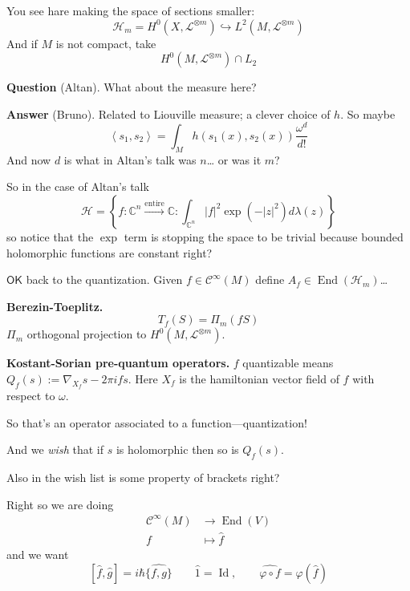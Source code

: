 You see hare making the space of sections
smaller:
$$
\mathcal{H}_m=H^{0}(X,\mathcal{L}^{\otimes
m})\hookrightarrow L^2(M,\mathcal{L}^{\otimes
m})
$$
And if $M$ is not compact, take
$$
H^{0}(M,\mathcal{L}^{\otimes m})\cap L_2
$$

\medskip\noindent
{\bf Question} (Altan).
What about the measure here?

\medskip\noindent
{\bf Answer} (Bruno).
Related to Liouville measure; a clever choice
of $h$. So maybe
$$
\left\langle{} s_1,s_2 \right\rangle{}
=\int_{M}h\left( s_1(x),s_2(x) \right)
\frac{\omega^d}{d!}
$$
And now $d$ is what in Altan's talk was
$n$\ldots{} or was it $m$?

\begin{remark}
\label{remark-suassuna-altan}
So in the case of Altan's talk
$$
\mathcal{H}=\left\{
f:\mathbb{C}^{n}\overset{\operatorname{entire}}{\longrightarrow}
\mathbb{C}:\int_{\mathbb{C}^{n}}|f|^2
\operatorname{exp}(-|z|^2)
d \lambda(z) \right\}
$$
so notice that the $\operatorname{exp}$ term
is stopping the space to be trivial because
bounded holomorphic functions are constant
right?
\end{remark}

$\mathsf{OK}$ back to the quantization. Given
$f \in\mathcal{C}^\infty(M)$ define $A_f
\in\operatorname{End}(\mathcal{H}_m)$\ldots{}

\medskip\noindent
{\bf Berezin-Toeplitz.}
$$
T_f(S)=\Pi_m(fS)
$$
$\Pi_m$ orthogonal projection to
$H^{0}(M,\mathcal{L}^{\otimes m})$.

\medskip\noindent
{\bf Kostant-Sorian pre-quantum operators.}
$f$ quantizable means
$Q_f(s):=\nabla_{X_f}s-2\pi i fs$. Here $X_f$
is the hamiltonian vector field of $f$ with
respect to $\omega$.

So that's an operator associated to a
function---quantization!

And we \emph{wish} that if $s$ is holomorphic
then so is $Q_f(s)$.

\begin{remark}[Sergey]
\label{remark-suassuna-wish-list}
Also in the wish list is some property of
brackets right?
\end{remark}

Right so we are doing
$$
\begin{aligned}
\mathcal{C}^\infty(M) &\longrightarrow
\operatorname{End}(V) \\
f &\longmapsto \hat{f}
\end{aligned}
$$
and we want
$$
[\hat{f},\hat{g}]=i\hbar \widehat{\{f,g\}}
\qquad \hat{1}=\operatorname{Id}, \qquad
\widehat{\varphi\circ f}=\varphi(\hat{f})
$$

